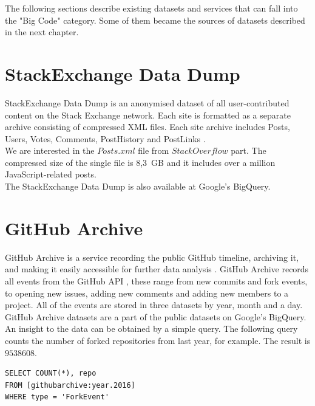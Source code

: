 \documentclass[thesis=M,english]{FITthesis}[2012/10/20]
\begin{document}
The following sections describe existing datasets and services that can fall into the "Big Code" category. Some of them became the sources of datasets described in the next chapter.

\section{StackExchange Data Dump}

StackExchange Data Dump is an anonymised dataset of all user-contributed content on the Stack Exchange network. Each site is formatted as a separate archive consisting of compressed XML files. Each site archive includes Posts, Users, Votes, Comments, PostHistory and PostLinks \cite{se_dump}. \\

We are interested in the $Posts.xml$ file from $StackOverflow$ part. The compressed size of the single file is 8,3~GB and it includes over a million JavaScript-related posts. \\

The StackExchange Data Dump is also available at Google's BigQuery. \\

\section{GitHub Archive}

GitHub Archive is a service recording the public GitHub timeline, archiving it, and making it easily accessible for further data analysis \cite{gharchive}. GitHub Archive records all events from the GitHub API \cite{gh_events}, these range from new commits and fork events, to opening new issues, adding new comments and adding new members to a project. All of the events are stored in three datasets by year, month and a day. GitHub Archive datasets are a part of the public datasets on Google's BigQuery. \\

An insight to the data can be obtained by a simple query. The following query counts the number of forked repositories from last year, for example. The result is $9538608$. \\

\lstset{title=Count the number of forks from last year}
\begin{lstlisting}[basicstyle=\small]
SELECT COUNT(*), repo
FROM [githubarchive:year.2016]
WHERE type = 'ForkEvent'
\end{lstlisting}
\end{document}
